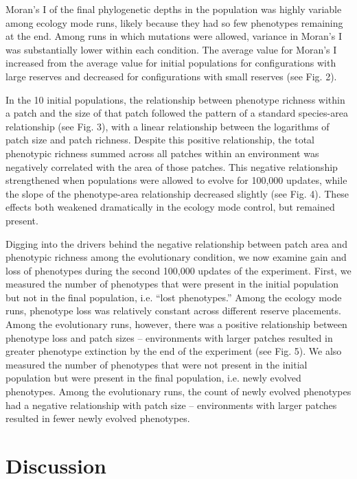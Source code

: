 \documentclass[letterpaper]{article}
\begin{document}
	Moran's I of the final phylogenetic depths in the population was highly variable among ecology mode runs, likely because  they had so few phenotypes remaining at the end. Among runs in which mutations were allowed, variance in Moran's I was substantially lower within each condition. The average value for Moran's I increased from the average value for initial populations for configurations with large reserves and decreased for configurations with small reserves (see Fig. 2).
    
	In the 10 initial populations, the relationship between phenotype richness within a patch and the size of that patch followed the pattern of a standard species-area relationship (see Fig. 3), with a linear relationship between the logarithms  of patch size and patch richness. Despite this positive relationship, the total phenotypic richness summed across all patches within an environment was negatively correlated with the area of those patches. This negative relationship strengthened when populations were allowed to evolve for 100,000 updates, while the slope of the phenotype-area relationship decreased slightly (see Fig. 4). These effects both weakened dramatically in the ecology mode control, but remained present.
    
	Digging into the drivers behind the negative relationship between patch area and phenotypic richness among the evolutionary condition, we now examine gain and loss of phenotypes during the second 100,000 updates of the experiment. First, we measured the number of phenotypes that were present in the initial population but not in the final population, i.e. “lost phenotypes.” Among the ecology mode runs, phenotype loss was relatively constant across different reserve placements. Among the evolutionary runs, however, there was a positive relationship between phenotype loss and patch sizes – environments with larger patches resulted in greater phenotype extinction by the end of the experiment (see Fig. 5). We also measured the number of phenotypes that were not present in the initial population but were present in the final population, i.e. newly evolved phenotypes. Among the evolutionary runs, the count of newly evolved phenotypes had a negative relationship with patch size – environments with larger patches resulted in fewer newly evolved phenotypes.

\section{Discussion}
\end{document}

